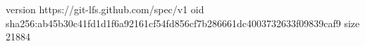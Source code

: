 version https://git-lfs.github.com/spec/v1
oid sha256:ab45b30c41fd1d1f6a92161cf54fd856cf7b286661dc4003732633f09839caf9
size 21884
